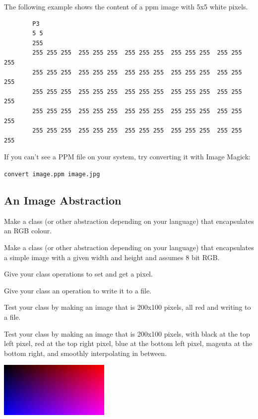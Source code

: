 \documentclass{article}
\begin{document}
	The following example shows the content of a ppm image with 5x5 white pixels.

	\begin{lstlisting}
		P3
		5 5
		255
		255 255 255  255 255 255  255 255 255  255 255 255  255 255 255
		255 255 255  255 255 255  255 255 255  255 255 255  255 255 255
		255 255 255  255 255 255  255 255 255  255 255 255  255 255 255
		255 255 255  255 255 255  255 255 255  255 255 255  255 255 255
		255 255 255  255 255 255  255 255 255  255 255 255  255 255 255      
	\end{lstlisting}

        If you can't see a PPM file on your system, try converting it with Image Magick:
        \begin{centering}
            \texttt{convert image.ppm image.jpg}
        \end{centering}
        
        \subsection{An Image Abstraction}
            Make a class (or other abstraction depending on your language) that encapsulates an RGB colour.
        
            Make a class (or other abstraction depending on your language) that encapsulates a simple image with a given width and height 
            and assumes 8 bit RGB.
            
            Give your class operations to set and get a pixel.
            
            Give your class an operation to write it to a file.

            Test your class by making an image that is 200x100 pixels, all red and writing to a file. 

            Test your class by making an image that is 200x100 pixels, with black at the top left pixel, red at the top right pixel,
            blue at the bottom left pixel, magenta at the bottom right, and smoothly interpolating in between.
    
            \begin{center}
                \includegraphics[width=0.4\textwidth]{smooth}
            \end{center}
    
\end{document}
